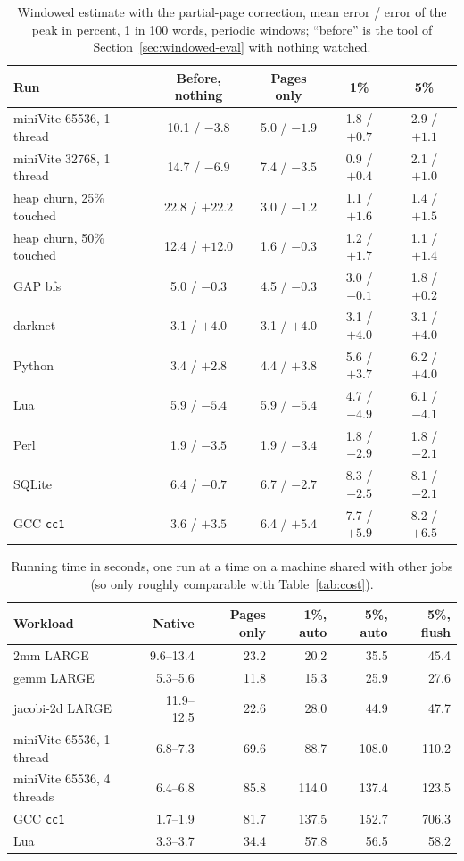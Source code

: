 \documentclass[11pt]{article}
\newcommand{\secref}[1]{Section~\ref{#1}}
\newcommand{\tabref}[1]{Table~\ref{#1}}
\begin{document}
\begin{table}[t]
\centering
\small
\caption{Windowed estimate with the partial-page correction, mean error / error of the peak in percent, 1 in 100 words, periodic windows; ``before'' is the tool of \secref{sec:windowed-eval} with nothing watched.}
\label{tab:nextround}
\begin{tabular}{lcccc}
\toprule
Run & Before, nothing & Pages only & 1\% & 5\% \\
\midrule
miniVite 65536, 1 thread & 10.1 / $-3.8$ & 5.0 / $-1.9$ & 1.8 / $+0.7$ & 2.9 / $+1.1$ \\
miniVite 32768, 1 thread & 14.7 / $-6.9$ & 7.4 / $-3.5$ & 0.9 / $+0.4$ & 2.1 / $+1.0$ \\
heap churn, 25\% touched & 22.8 / $+22.2$ & 3.0 / $-1.2$ & 1.1 / $+1.6$ & 1.4 / $+1.5$ \\
heap churn, 50\% touched & 12.4 / $+12.0$ & 1.6 / $-0.3$ & 1.2 / $+1.7$ & 1.1 / $+1.4$ \\
GAP bfs & 5.0 / $-0.3$ & 4.5 / $-0.3$ & 3.0 / $-0.1$ & 1.8 / $+0.2$ \\
darknet & 3.1 / $+4.0$ & 3.1 / $+4.0$ & 3.1 / $+4.0$ & 3.1 / $+4.0$ \\
Python & 3.4 / $+2.8$ & 4.4 / $+3.8$ & 5.6 / $+3.7$ & 6.2 / $+4.0$ \\
Lua & 5.9 / $-5.4$ & 5.9 / $-5.4$ & 4.7 / $-4.9$ & 6.1 / $-4.1$ \\
Perl & 1.9 / $-3.5$ & 1.9 / $-3.4$ & 1.8 / $-2.9$ & 1.8 / $-2.1$ \\
SQLite & 6.4 / $-0.7$ & 6.7 / $-2.7$ & 8.3 / $-2.5$ & 8.1 / $-2.1$ \\
GCC \texttt{cc1} & 3.6 / $+3.5$ & 6.4 / $+5.4$ & 7.7 / $+5.9$ & 8.2 / $+6.5$ \\
\bottomrule
\end{tabular}
\end{table}

\begin{table}[t]
\centering
\small
\caption{Running time in seconds, one run at a time on a machine shared with other jobs (so only roughly comparable with \tabref{tab:cost}).}
\label{tab:nextcost}
\begin{tabular}{lrrrrr}
\toprule
Workload & Native & Pages only & 1\%, auto & 5\%, auto & 5\%, flush \\
\midrule
2mm LARGE & 9.6--13.4 & 23.2 & 20.2 & 35.5 & 45.4 \\
gemm LARGE & 5.3--5.6 & 11.8 & 15.3 & 25.9 & 27.6 \\
jacobi-2d LARGE & 11.9--12.5 & 22.6 & 28.0 & 44.9 & 47.7 \\
miniVite 65536, 1 thread & 6.8--7.3 & 69.6 & 88.7 & 108.0 & 110.2 \\
miniVite 65536, 4 threads & 6.4--6.8 & 85.8 & 114.0 & 137.4 & 123.5 \\
GCC \texttt{cc1} & 1.7--1.9 & 81.7 & 137.5 & 152.7 & 706.3 \\
Lua & 3.3--3.7 & 34.4 & 57.8 & 56.5 & 58.2 \\
\bottomrule
\end{tabular}
\end{table}
\end{document}
